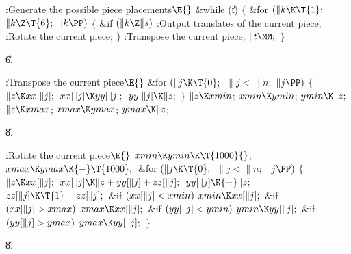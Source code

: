 \B{}:Generate the possible piece placements\X${}\E{}$\6
\&{while} (\|t)\5
${}\{{}$\1\6
\&{for} ${}(\|k\K\T{1};{}$ ${}\|k\Z\T{6};{}$ ${}\|k\PP){}$\5
${}\{{}$\1\6
\&{if} ${}(\|k\Z\|s){}$\1\5
:Output translates of the current piece\X;\2\6
:Rotate the current piece\X;\6
\4${}\}{}$\2\6
:Transpose the current piece\X;\6
${}\|t\MM;{}$\6
\4${}\}{}$\2\par
\U6.\fi

\B{}:Transpose the current piece\X${}\E{}$\6
\&{for} ${}(\|j\K\T{0};{}$ ${}\|j<\|n;{}$ ${}\|j\PP){}$\5
${}\{{}$\1\6
${}\|z\K\\{xx}[\|j];{}$\6
${}\\{xx}[\|j]\K\\{yy}[\|j];{}$\6
${}\\{yy}[\|j]\K\|z;{}$\6
\4${}\}{}$\2\6
${}\|z\K\\{xmin}{}$;\5
${}\\{xmin}\K\\{ymin}{}$;\5
${}\\{ymin}\K\|z;{}$\6
${}\|z\K\\{xmax}{}$;\5
${}\\{xmax}\K\\{ymax}{}$;\5
${}\\{ymax}\K\|z{}$;\par
\U8.\fi

\B{}:Rotate the current piece\X${}\E{}$\6
$\\{xmin}\K\\{ymin}\K\T{1000}{}$;\5
${}\\{xmax}\K\\{ymax}\K{-}\T{1000};{}$\6
\&{for} ${}(\|j\K\T{0};{}$ ${}\|j<\|n;{}$ ${}\|j\PP){}$\5
${}\{{}$\1\6
${}\|z\K\\{xx}[\|j];{}$\6
${}\\{xx}[\|j]\K\|z+\\{yy}[\|j]+\\{zz}[\|j];{}$\6
${}\\{yy}[\|j]\K{-}\|z;{}$\6
${}\\{zz}[\|j]\K\T{1}-\\{zz}[\|j];{}$\6
\&{if} ${}(\\{xx}[\|j]<\\{xmin}){}$\1\5
${}\\{xmin}\K\\{xx}[\|j];{}$\2\6
\&{if} ${}(\\{xx}[\|j]>\\{xmax}){}$\1\5
${}\\{xmax}\K\\{xx}[\|j];{}$\2\6
\&{if} ${}(\\{yy}[\|j]<\\{ymin}){}$\1\5
${}\\{ymin}\K\\{yy}[\|j];{}$\2\6
\&{if} ${}(\\{yy}[\|j]>\\{ymax}){}$\1\5
${}\\{ymax}\K\\{yy}[\|j];{}$\2\6
\4${}\}{}$\2\par
\U8.\fi

